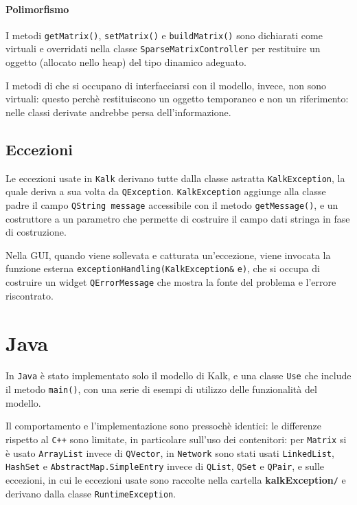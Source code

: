 \paragraph{Polimorfismo} 
I metodi \texttt{getMatrix()}, \texttt{setMatrix()} e \texttt{buildMatrix()} sono dichiarati come virtuali e overridati nella classe 
\texttt{SparseMatrixController} per restituire un oggetto (allocato nello heap) del tipo dinamico adeguato.\par
I metodi di che si occupano di interfacciarsi con il modello, invece, non sono virtuali: questo perchè restituiscono un oggetto 
temporaneo e non un riferimento: nelle classi derivate andrebbe persa dell'informazione.

\subsection{Eccezioni}

Le eccezioni usate in \texttt{Kalk} derivano tutte dalla classe astratta \texttt{KalkException}, la quale deriva a sua volta da \texttt{QException}.
\texttt{KalkException} aggiunge alla classe padre il campo \texttt{QString message} accessibile con il metodo \texttt{getMessage()}, e un 
costruttore a un parametro che permette di costruire il campo dati stringa in fase di costruzione. \par
Nella GUI, quando viene sollevata e catturata un'eccezione, viene invocata la funzione esterna \texttt{exceptionHandling(KalkException}\verb|&| \texttt{e)}, che si occupa di costruire un 
widget \texttt{QErrorMessage} che mostra la fonte del problema e l'errore riscontrato.

\section{Java}

In \texttt{Java} è stato implementato solo il modello di Kalk, e una classe \texttt{Use} che include il metodo \texttt{main()}, con una 
serie di esempi di utilizzo delle funzionalità del modello.\par
Il comportamento e l'implementazione sono pressochè identici: le differenze rispetto al \texttt{C++} sono limitate, in particolare 
sull'uso dei contenitori: per \texttt{Matrix} si è usato \texttt{ArrayList} invece di \texttt{QVector}, in \texttt{Network} sono stati 
usati \texttt{LinkedList}, \texttt{HashSet} e \texttt{AbstractMap.SimpleEntry} invece di \texttt{QList}, \texttt{QSet} e \texttt{QPair}, e sulle eccezioni, 
in cui le eccezioni usate sono raccolte nella cartella \textbf{kalkException}\verb|/| e derivano dalla classe \texttt{RuntimeException}.